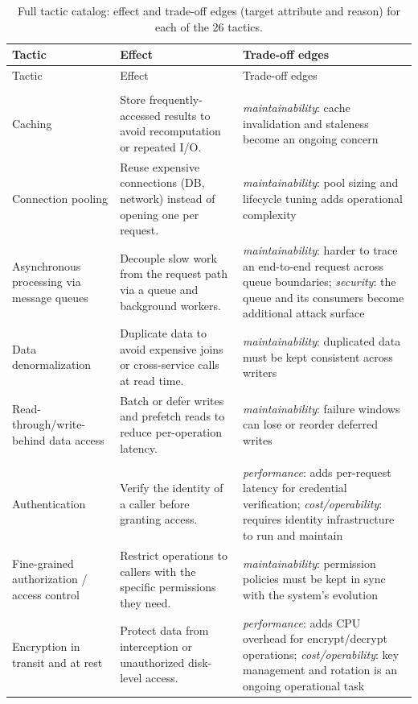 \documentclass[preprint,12pt,authoryear]{elsarticle}
\renewcommand{\_}{\textunderscore\allowbreak{}}
\begin{document}
{\footnotesize
\setlength{\tabcolsep}{3pt}
\begin{longtable}{@{}>{\raggedright\arraybackslash}p{1.35in}>{\raggedright\arraybackslash}p{1.65in}>{\raggedright\arraybackslash}p{2.35in}@{}}
\caption{Full tactic catalog: effect and trade-off edges (target attribute and reason) for each of the 26 tactics.\label{tab:catalog-full}}\\
\toprule
Tactic & Effect & Trade-off edges \\
\midrule
\endfirsthead
\toprule
Tactic & Effect & Trade-off edges \\
\midrule
\endhead
\bottomrule
\endfoot
\multicolumn{3}{@{}l}{\textbf{Performance}} \\
\midrule
Caching & Store frequently-accessed results to avoid recomputation or repeated I/O. & \emph{maintainability}: cache invalidation and staleness become an ongoing concern \\
Connection pooling & Reuse expensive connections (DB, network) instead of opening one per request. & \emph{maintainability}: pool sizing and lifecycle tuning adds operational complexity \\
Asynchronous processing via message queues & Decouple slow work from the request path via a queue and background workers. & \emph{maintainability}: harder to trace an end-to-end request across queue boundaries; \emph{security}: the queue and its consumers become additional attack surface \\
Data denormalization & Duplicate data to avoid expensive joins or cross-service calls at read time. & \emph{maintainability}: duplicated data must be kept consistent across writers \\
Read-through/write-behind data access & Batch or defer writes and prefetch reads to reduce per-operation latency. & \emph{maintainability}: failure windows can lose or reorder deferred writes \\
\midrule
\multicolumn{3}{@{}l}{\textbf{Security}} \\
\midrule
Authentication & Verify the identity of a caller before granting access. & \emph{performance}: adds per-request latency for credential verification; \emph{cost/operability}: requires identity infrastructure to run and maintain \\
Fine-grained authorization / access control & Restrict operations to callers with the specific permissions they need. & \emph{maintainability}: permission policies must be kept in sync with the system's evolution \\
Encryption in transit and at rest & Protect data from interception or unauthorized disk-level access. & \emph{performance}: adds CPU overhead for encrypt/decrypt operations; \emph{cost/operability}: key management and rotation is an ongoing operational task \\

\end{longtable}}
\end{document}
